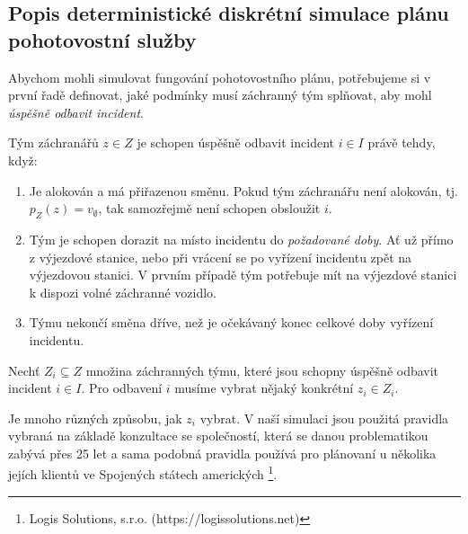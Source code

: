\subsection{Popis deterministické diskrétní simulace plánu pohotovostní služby}\label{kap:definiceSimulace}

Abychom mohli simulovat fungování pohotovostního plánu,
potřebujeme si v první řadě definovat, jaké podmínky musí záchranný tým splňovat, aby mohl \textit{úspěšně odbavit incident}.

\begin{definice}\label{df:simulacePravidla1}
  Tým záchranářů $z \in Z$ je schopen úspěšně odbavit incident $i \in I$ právě tehdy, když:
  \begin{enumerate}
    \item
      Je alokován a má přiřazenou směnu. Pokud tým záchranářu není alokován, tj. $p_Z(z) = v_{\emptyset}$, tak samozřejmě není schopen obsloužit $i$.

    \item
      Tým je schopen dorazit na místo incidentu do \emph{požadované doby}.
      Ať už přímo z výjezdové stanice, nebo při vrácení se po vyřízení incidentu zpět na výjezdovou stanici. 
      V prvním případě tým potřebuje mít na výjezdové stanici k dispozi volné záchranné vozidlo.

    \item
      Týmu nekončí směna dříve, než je očekávaný konec celkové doby vyřízení incidentu.
  \end{enumerate}
\end{definice}

Nechť $Z_i \subseteq Z$ množina záchranných týmu, které jsou schopny úspěšně odbavit incident $i \in I$.
Pro odbavení $i$ musíme vybrat nějaký konkrétní $z_i \in Z_i$.

Je mnoho různých způsobu, jak $z_i$ vybrat.
V naší simulaci jsou použitá pravidla vybraná na základě konzultace se společností, která se danou problematikou zabývá přes 25 let
a sama podobná pravidla používá pro plánovaní u několika jejích klientů ve Spojených státech amerických \footnote{Logis Solutions, s.r.o. (https://logissolutions.net)}.

